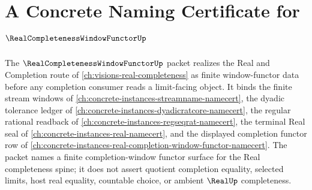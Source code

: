 \chapter{A Concrete Naming Certificate for $\RealCompletenessWindowFunctorUp$}
\label{ch:concrete-instances-real-completeness-window-functor-namecert}

The $\RealCompletenessWindowFunctorUp$ packet realizes the Real and Completion route of \autoref{ch:visions-real-completeness} as finite window-functor data before any completion consumer reads a limit-facing object. It binds the finite stream windows of \autoref{ch:concrete-instances-streamname-namecert}, the dyadic tolerance ledger of \autoref{ch:concrete-instances-dyadicratcore-namecert}, the regular rational readback of \autoref{ch:concrete-instances-regseqrat-namecert}, the terminal Real seal of \autoref{ch:concrete-instances-real-namecert}, and the displayed completion functor row of \autoref{ch:concrete-instances-real-completion-window-functor-namecert}. The packet names a finite completion-window functor surface for the Real completeness spine; it does not assert quotient completion equality, selected limits, host real equality, countable choice, or ambient $\RealUp$ completeness.

